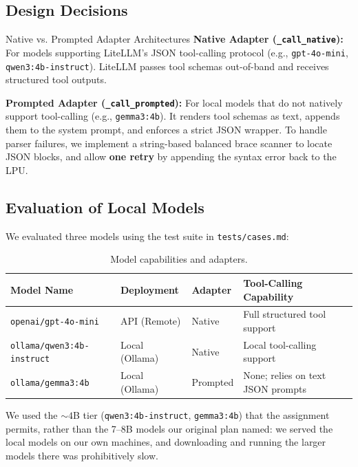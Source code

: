 \documentclass[11pt,a4paper]{article}
\begin{document}
\subsection{Design Decisions}

\begin{decisionbox}{Native vs. Prompted Adapter Architectures}
    \textbf{Native Adapter (\texttt{\_call\_native}):} For models supporting LiteLLM's JSON tool-calling protocol (e.g., \texttt{gpt-4o-mini}, \texttt{qwen3:4b-instruct}). LiteLLM passes tool schemas out-of-band and receives structured tool outputs.
    
    \textbf{Prompted Adapter (\texttt{\_call\_prompted}):} For local models that do not natively support tool-calling (e.g., \texttt{gemma3:4b}). It renders tool schemas as text, appends them to the system prompt, and enforces a strict JSON wrapper. To handle parser failures, we implement a string-based balanced brace scanner to locate JSON blocks, and allow \textbf{one retry} by appending the syntax error back to the LPU.
\end{decisionbox}

\subsection{Evaluation of Local Models}
We evaluated three models using the test suite in \texttt{tests/cases.md}:
\begin{table}[htbp]
    \centering
    \caption{Model capabilities and adapters.}
    \begin{tabularx}{\textwidth}{lllX}
        \toprule
        \textbf{Model Name} & \textbf{Deployment} & \textbf{Adapter} & \textbf{Tool-Calling Capability} \\
        \midrule
        \texttt{openai/gpt-4o-mini} & API (Remote) & Native & Full structured tool support \\
        \texttt{ollama/qwen3:4b-instruct} & Local (Ollama) & Native & Local tool-calling support \\
        \texttt{ollama/gemma3:4b} & Local (Ollama) & Prompted & None; relies on text JSON prompts \\
        \bottomrule
    \end{tabularx}
    \label{tab:models_eval}
\end{table}

We used the ${\sim}4$B tier (\texttt{qwen3:4b-instruct}, \texttt{gemma3:4b}) that the assignment permits, rather than the 7--8B models our original plan named: we served the local models on our own machines, and downloading and running the larger models there was prohibitively slow.
\end{document}

